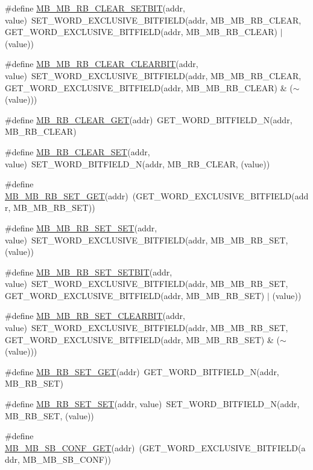 \begin{DoxyCompactItemize}
\#define \hyperlink{a00561_ad386cb09c10a933ea1c84691ca9fe5e0}{MB\_\-MB\_\-RB\_\-CLEAR\_\-SETBIT}(addr, value)~SET\_\-WORD\_\-EXCLUSIVE\_\-BITFIELD(addr, MB\_\-MB\_\-RB\_\-CLEAR, GET\_\-WORD\_\-EXCLUSIVE\_\-BITFIELD(addr, MB\_\-MB\_\-RB\_\-CLEAR) $|$ (value))
\item 
\#define \hyperlink{a00561_a2c963c5e3f6dc05b1b114580cfe11562}{MB\_\-MB\_\-RB\_\-CLEAR\_\-CLEARBIT}(addr, value)~SET\_\-WORD\_\-EXCLUSIVE\_\-BITFIELD(addr, MB\_\-MB\_\-RB\_\-CLEAR, GET\_\-WORD\_\-EXCLUSIVE\_\-BITFIELD(addr, MB\_\-MB\_\-RB\_\-CLEAR) \& ($\sim$(value)))
\item 
\#define \hyperlink{a00561_a3ebc80f7df209d3a5ef24ddd309ea3a9}{MB\_\-RB\_\-CLEAR\_\-GET}(addr)~GET\_\-WORD\_\-BITFIELD\_\-N(addr, MB\_\-RB\_\-CLEAR)
\item 
\#define \hyperlink{a00561_a5b5dad6cf64ba2637dae6ea84ff6f326}{MB\_\-RB\_\-CLEAR\_\-SET}(addr, value)~SET\_\-WORD\_\-BITFIELD\_\-N(addr, MB\_\-RB\_\-CLEAR, (value))
\item 
\#define \hyperlink{a00561_a053c83aefc9aab3f339f4ba4123a6a11}{MB\_\-MB\_\-RB\_\-SET\_\-GET}(addr)~(GET\_\-WORD\_\-EXCLUSIVE\_\-BITFIELD(addr, MB\_\-MB\_\-RB\_\-SET))
\item 
\#define \hyperlink{a00561_a6349a1232f6fb43f85f4edd760a5cb21}{MB\_\-MB\_\-RB\_\-SET\_\-SET}(addr, value)~SET\_\-WORD\_\-EXCLUSIVE\_\-BITFIELD(addr, MB\_\-MB\_\-RB\_\-SET, (value))
\item 
\#define \hyperlink{a00561_a237eb1f9f1b0b719fb8a449604df0866}{MB\_\-MB\_\-RB\_\-SET\_\-SETBIT}(addr, value)~SET\_\-WORD\_\-EXCLUSIVE\_\-BITFIELD(addr, MB\_\-MB\_\-RB\_\-SET, GET\_\-WORD\_\-EXCLUSIVE\_\-BITFIELD(addr, MB\_\-MB\_\-RB\_\-SET) $|$ (value))
\item 
\#define \hyperlink{a00561_a71359350d8134a0883aedd7d29747a1e}{MB\_\-MB\_\-RB\_\-SET\_\-CLEARBIT}(addr, value)~SET\_\-WORD\_\-EXCLUSIVE\_\-BITFIELD(addr, MB\_\-MB\_\-RB\_\-SET, GET\_\-WORD\_\-EXCLUSIVE\_\-BITFIELD(addr, MB\_\-MB\_\-RB\_\-SET) \& ($\sim$(value)))
\item 
\#define \hyperlink{a00561_adc6d08f73151fe3bd006900aa15e3269}{MB\_\-RB\_\-SET\_\-GET}(addr)~GET\_\-WORD\_\-BITFIELD\_\-N(addr, MB\_\-RB\_\-SET)
\item 
\#define \hyperlink{a00561_a972149d41f137ec23560c01129987145}{MB\_\-RB\_\-SET\_\-SET}(addr, value)~SET\_\-WORD\_\-BITFIELD\_\-N(addr, MB\_\-RB\_\-SET, (value))
\item 
\#define \hyperlink{a00561_ab358ac79f8c7e67b8bda6e46c1953e7a}{MB\_\-MB\_\-SB\_\-CONF\_\-GET}(addr)~(GET\_\-WORD\_\-EXCLUSIVE\_\-BITFIELD(addr, MB\_\-MB\_\-SB\_\-CONF))

\end{DoxyCompactItemize}
